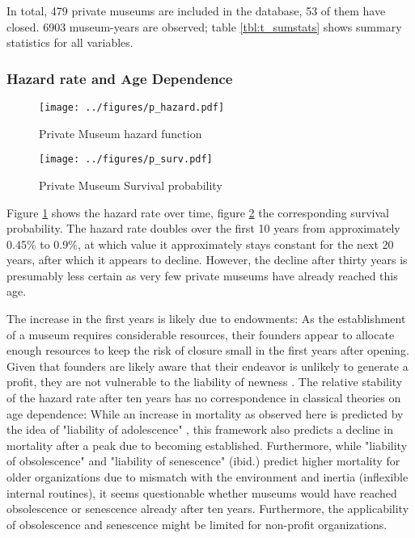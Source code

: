 \documentclass[12pt]{article}
\begin{document}
In total, 479 private museums are included in the database, 53 of them have closed.
6903 museum-years are observed; table \ref{tbl:t_sumstats} shows summary statistics for all variables.

\subsubsection*{Hazard rate and Age Dependence}


\begin{figure}[htbp]
\centering
\texttt{[image: ../figures/p\_hazard.pdf]}
\caption{\label{fig:p_hazard}Private Museum hazard function}
\end{figure}

\begin{figure}[htbp]
\centering
\texttt{[image: ../figures/p\_surv.pdf]}
\caption{\label{fig:p_surv}Private Museum Survival probability}
\end{figure}


Figure \ref{fig:p_hazard} shows the hazard rate over time, figure \ref{fig:p_surv} the corresponding survival probability.
The hazard rate doubles over the first 10 years from approximately 0.45\% to 0.9\%, at which value it approximately stays constant for the next 20 years, after which it appears to decline.
However, the decline after thirty years is presumably less certain as very few private museums have already reached this age.


The increase in the first years is likely due to endowments: As the establishment of a museum requires considerable resources, their founders appear to allocate enough resources to keep the risk of closure small in the first years after opening.
Given that founders are likely aware that their endeavor is unlikely to generate a profit, they are not vulnerable to the liability of newness \parencite{Stinchcombe_1965_structure}.
The relative stability of the hazard rate after ten years has no correspondence in classical theories on age dependence:
While an increase in mortality as observed here is predicted by the idea of "liability of adolescence" \parencite{Carroll_Khessina_2019_demography}, this framework also predicts a decline in mortality after a peak due to becoming established.
Furthermore, while "liability of obsolescence" and "liability of senescence" (ibid.) predict higher mortality for older organizations due to mismatch with the environment and inertia (inflexible internal routines), it seems questionable whether museums would have reached obsolescence or senescence already after ten years.
Furthermore, the applicability of obsolescence and senescence might be limited for non-profit organizations.
\end{document}
